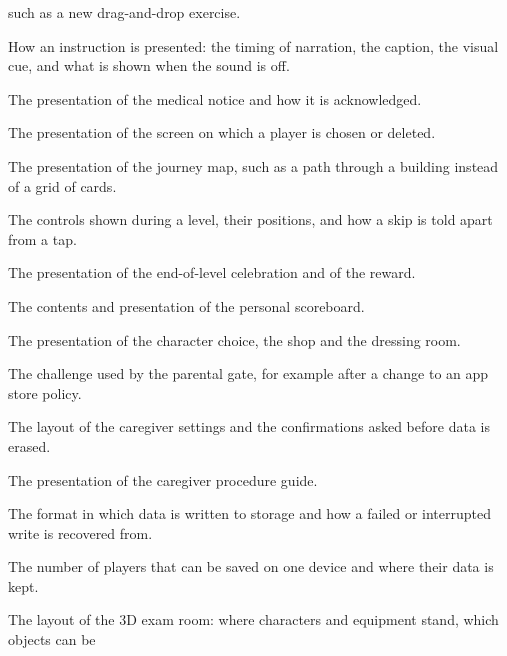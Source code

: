 \documentclass[12pt, titlepage]{article}
\newcounter{acnum}
\newcommand{\actheacnum}{AC\theacnum}
\begin{document}
\begin{description}
  such as a new drag-and-drop exercise.
\item[\refstepcounter{acnum} \actheacnum \label{acNarration}:] How an
  instruction is presented: the timing of narration, the caption, the visual
  cue, and what is shown when the sound is off.
\item[\refstepcounter{acnum} \actheacnum \label{acNotice}:] The presentation of
  the medical notice and how it is acknowledged.
\item[\refstepcounter{acnum} \actheacnum \label{acPlayerSelect}:] The
  presentation of the screen on which a player is chosen or deleted.
\item[\refstepcounter{acnum} \actheacnum \label{acMap}:] The presentation of
  the journey map, such as a path through a building instead of a grid of
  cards.
\item[\refstepcounter{acnum} \actheacnum \label{acHud}:] The controls shown
  during a level, their positions, and how a skip is told apart from a tap.
\item[\refstepcounter{acnum} \actheacnum \label{acReward}:] The presentation of
  the end-of-level celebration and of the reward.
\item[\refstepcounter{acnum} \actheacnum \label{acScoreboard}:] The contents
  and presentation of the personal scoreboard.
\item[\refstepcounter{acnum} \actheacnum \label{acDressUp}:] The presentation
  of the character choice, the shop and the dressing room.
\item[\refstepcounter{acnum} \actheacnum \label{acGate}:] The challenge used by
  the parental gate, for example after a change to an app store policy.
\item[\refstepcounter{acnum} \actheacnum \label{acSettings}:] The layout of the
  caregiver settings and the confirmations asked before data is erased.
\item[\refstepcounter{acnum} \actheacnum \label{acGuide}:] The presentation of
  the caregiver procedure guide.
\item[\refstepcounter{acnum} \actheacnum \label{acDataFile}:] The format in
  which data is written to storage and how a failed or interrupted write is
  recovered from.
\item[\refstepcounter{acnum} \actheacnum \label{acSlots}:] The number of
  players that can be saved on one device and where their data is kept.
\item[\refstepcounter{acnum} \actheacnum \label{acStaging}:] The layout of the
  3D exam room: where characters and equipment stand, which objects can be

\end{description}
\end{document}
